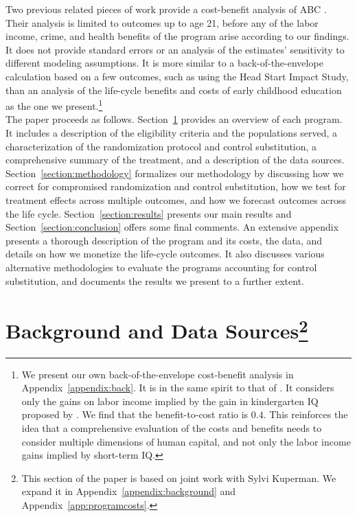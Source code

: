 \noindent Two previous related pieces of work provide a cost-benefit analysis of ABC \citep{Masse_Barnett_2002_BOOKBenefitCostAnalysis,Barnett_Masse_2007_EER}. Their analysis is limited to outcomes up to age 21, before any of the labor income, crime, and health benefits of the program arise according to our findings. It does not provide standard errors or an analysis of the estimates' sensitivity to different modeling assumptions. It is more similar to a back-of-the-envelope calculation based on a few outcomes, such as \citet{Kline-Walters_2015_NBER-Evaluating} using the Head Start Impact Study, than an analysis of the life-cycle benefits and costs of early childhood education as the one we present.\footnote{We present our own back-of-the-envelope cost-benefit analysis in Appendix~\ref{appendix:back}. It is in the same spirit to that of \citet{
Kline-Walters_2015_NBER-Evaluating}. It considers only the gains on labor income implied by the gain in kindergarten IQ proposed by \citet{
Chetty_Friedman_etal_2011_QJoE}. We find that the benefit-to-cost ratio is $0.4$. This reinforces the idea that a comprehensive evaluation of the costs and benefits needs to consider multiple dimensions of human capital, and not only the labor income gains implied by short-term IQ.} \\ 

\noindent The paper proceeds as follows. Section~\ref{section:background}  provides an overview of each program. It includes a description of the eligibility criteria and the populations served, a characterization of the randomization protocol and control substitution, a comprehensive summary of the treatment, and a description of the data sources. Section~\ref{section:methodology} formalizes our methodology by discussing how we correct for compromised randomization and control substitution, how we test for treatment effects across multiple outcomes, and how we forecast outcomes across the life cycle. Section~\ref{section:results} presents our main results and Section~\ref{section:conclusion} offers some final comments. An extensive appendix presents a thorough description of the program and its costs, the data, and details on how we monetize the life-cycle outcomes. It also discusses various alternative methodologies to evaluate the programs accounting for control substitution, and documents the results we present to a further extent.

\section[Background and Data Sources]{Background and Data Sources\footnote{This section of the paper is based on joint work with Sylvi Kuperman. We expand it  in Appendix~\ref{appendix:background} and Appendix~\ref{app:programcosts}.}} \label{section:background}

